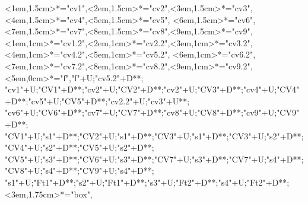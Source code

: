 \begin{multicols}{2}
\begin{exe}
{\begin{xlist}
{		<1em,1.5cm>*="cv1",<2em,1.5cm>*="cv2",<3em,1.5cm>*\as{ }="cv3",<4em,1.5cm>*\as{ }="cv4",<5em,1.5cm>*\as{\j}="cv5",
		<6em,1.5cm>*="cv6",<7em,1.5cm>*\as{ }="cv7",<8em,1.5cm>*="cv8",<9em,1.5cm>*\as{ }="cv9",
		<1em,1cm>*="cv1.2",<2em,1cm>*="cv2.2",<3em,1cm>*\as{ }="cv3.2",<4em,1cm>*\as{ }="cv4.2",<5em,1cm>*\as{\j}="cv5.2",
		<6em,1cm>*="cv6.2",<7em,1cm>*\as{ }="cv7.2",<8em,1cm>*="cv8.2",<9em,1cm>*\as{ }="cv9.2",
		<5em,0cm>*\as{\tsc{[+fr.]}}="f","f"+U;"cv5.2"+D**\dir{-};
		"cv1"+U;"CV1"+D**\dir{-};"cv2"+U;"CV2"+D**\dir{-};"cv2"+U;"CV3"+D**;"cv4"+U;"CV4"+D**\dir{};"cv5"+U;"CV5"+D**\dir{-};"cv2.2"+U;"cv3"+U**;
		"cv6"+U;"CV6"+D**\dir{-};"cv7"+U;"CV7"+D**\dir{};"cv8"+U;"CV8"+D**\dir{-};"cv9"+U;"CV9"+D**\dir{};
		"CV1"+U;"s1"+D**\dir{-};"CV2"+U;"s1"+D**\dir{-};"CV3"+U;"s1"+D**\dir{};"CV3"+U;"s2"+D**\dir{-};"CV4"+U;"s2"+D**\dir{-};"CV5"+U;"s2"+D**\dir{};
		"CV5"+U;"s3"+D**\dir{-};"CV6"+U;"s3"+D**\dir{-};"CV7"+U;"s3"+D**\dir{-};"CV7"+U;"s4"+D**\dir{-};"CV8"+U;"s4"+D**\dir{-};"CV9"+U;"s4"+D**\dir{-};
		"s1"+U;"Ft1"+D**\dir{-};"s2"+U;"Ft1"+D**\dir{-};"s3"+U;"Ft2"+D**\dir{-};"s4"+U;"Ft2"+D**\dir{-};
		<3em,1.75cm>*="box",
	\endxy}
	\end{xlist}}
\end{exe}
\end{multicols}
